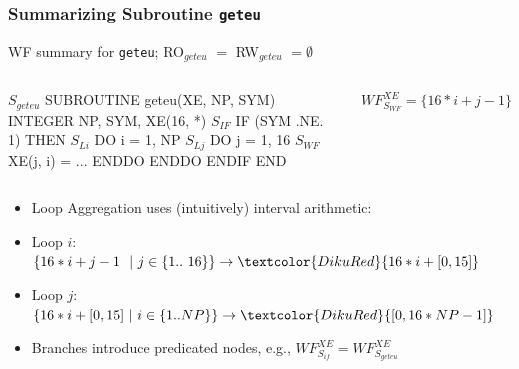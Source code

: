 \documentclass{beamer}
\renewcommand{\emph}[1]{\textcolor{structure}{#1}}
\newcommand{\emp}[1]{\textcolor{DikuRed}{ #1}}
\newcommand{\mymath}[1]{$ #1 $}
\newcommand{\myindx}[1]{_{#1}}
\newcommand{\myindu}[1]{^{#1}}
\begin{document}
\begin{frame}[fragile,t]
  \frametitle{Summarizing Subroutine {\tt geteu}}

\begin{block}{WF summary for {\tt geteu}; RO$_{geteu}$ $=$ RW$_{geteu}$ $= \emptyset$ } \vspace{-1ex}
\begin{columns} 
\begin{colorcode}[fontsize=\scriptsize]
\mymath{S\myindx{geteu}}  SUBROUTINE geteu(XE, NP, SYM)
         INTEGER NP, SYM, XE(16, *)  
\mymath{S\myindx{IF}}       \emph{IF (SYM .NE. 1) THEN}
\mymath{S\myindx{Li}}         \emp{DO i = 1, NP}
\mymath{S\myindx{Lj}}           \emp{DO j = 1, 16}
\mymath{S\myindx{WF}}             \alert{XE(j, i)} = ...
             \emp{ENDDO} 
           \emp{ENDDO}
         \emph{ENDIF}
       END
\end{colorcode}
\begin{colorcode}[fontsize=\scriptsize]








\alert{\mymath{WF\myindu{XE}\myindx{S\myindx{WF}} = \{16*i+j-1\}}}
\end{colorcode}
\end{columns}
\end{block}


\begin{itemize}
    \item Loop Aggregation uses (intuitively) interval arithmetic: \smallskip
    \item Loop $i$: $\{16*i + j - 1 \mbox{ }\mbox{ }|\mbox{ } j \in \{1..\mbox{ }16\}\} \rightarrow \emp{16*i + [0,15]}$ \smallskip
    \item Loop $j$: $\{16*i + [0,15] \mbox{ }|\mbox{ } i \in \{1..NP\}\} \rightarrow \emp{[0, 16*NP-1]}$  \smallskip
    \item Branches introduce predicated nodes, e.g., \emph{$WF^{XE}_{S_{if}} = WF^{XE}_{S_{geteu}}$} 
\end{itemize}
\end{frame}

\end{document}
